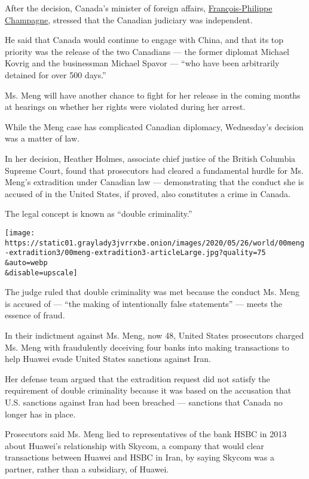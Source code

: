 After the decision, Canada's minister of foreign affairs,
\href{https://twitter.com/FP_Champagne/status/1265725645474213889}{François-Philippe
Champagne}, stressed that the Canadian judiciary was independent.

He said that Canada would continue to engage with China, and that its
top priority was the release of the two Canadians --- the former
diplomat Michael Kovrig and the businessman Michael Spavor --- ``who
have been arbitrarily detained for over 500 days.''

Ms. Meng will have another chance to fight for her release in the coming
months at hearings on whether her rights were violated during her
arrest.

While the Meng case has complicated Canadian diplomacy, Wednesday's
decision was a matter of law.

In her decision, Heather Holmes, associate chief justice of the British
Columbia Supreme Court, found that prosecutors had cleared a fundamental
hurdle for Ms. Meng's extradition under Canadian law --- demonstrating
that the conduct she is accused of in the United States, if proved, also
constitutes a crime in Canada.

The legal concept is known as ``double criminality.''

\texttt{[image: https://static01.graylady3jvrrxbe.onion/images/2020/05/26/world/00meng-extradition3/00meng-extradition3-articleLarge.jpg?quality=75\\\&auto=webp\\\&disable=upscale]}

The judge ruled that double criminality was met because the conduct Ms.
Meng is accused of --- ``the making of intentionally false statements''
--- meets the essence of fraud.

In their indictment against Ms. Meng, now 48, United States prosecutors
charged Ms. Meng with fraudulently deceiving four banks into making
transactions to help Huawei evade United States sanctions against Iran.

Her defense team argued that the extradition request did not satisfy the
requirement of double criminality because it was based on the accusation
that U.S. sanctions against Iran had been breached --- sanctions that
Canada no longer has in place.

Prosecutors said Ms. Meng lied to representatives of the bank HSBC in
2013 about Huawei's relationship with Skycom, a company that would clear
transactions between Huawei and HSBC in Iran, by saying Skycom was a
partner, rather than a subsidiary, of Huawei.


